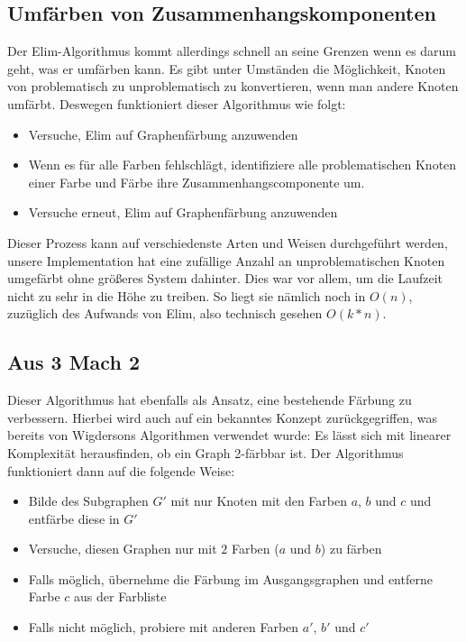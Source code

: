 \documentclass[11pt]{article}
\begin{document}
\subsection{Umfärben von Zusammenhangskomponenten}

Der Elim-Algorithmus kommt allerdings schnell an seine Grenzen wenn es darum geht, was er umfärben kann. Es gibt unter Umständen die Möglichkeit,
Knoten von problematisch zu unproblematisch zu konvertieren, wenn man andere Knoten umfärbt. Deswegen funktioniert dieser Algorithmus wie folgt: \\

\begin{itemize}
  \item Versuche, Elim auf Graphenfärbung anzuwenden
  \item Wenn es für alle Farben fehlschlägt, identifiziere alle problematischen Knoten einer Farbe und Färbe ihre Zusammenhangscomponente um.
  \item Versuche erneut, Elim auf Graphenfärbung anzuwenden
\end{itemize}

Dieser Prozess kann auf verschiedenste Arten und Weisen durchgeführt werden, unsere Implementation hat eine zufällige Anzahl an unproblematischen Knoten umgefärbt ohne größeres System dahinter.
Dies war vor allem, um die Laufzeit nicht zu sehr in die Höhe zu treiben. So liegt sie nämlich noch in $O(n)$, zuzüglich des Aufwands von Elim, also technisch gesehen $O(k*n)$.

\subsection{Aus 3 Mach 2}

Dieser Algorithmus hat ebenfalls als Ansatz, eine bestehende Färbung zu verbessern. Hierbei wird auch auf ein bekanntes Konzept
zurückgegriffen, was bereits von Wigdersons Algorithmen verwendet wurde: Es lässt sich mit linearer Komplexität herausfinden,
ob ein Graph 2-färbbar ist. Der Algorithmus funktioniert dann auf die folgende Weise: \\

\begin{itemize}
  \item Bilde des Subgraphen $G'$ mit nur Knoten mit den Farben $a$, $b$ und $c$ und entfärbe diese in $G'$
  \item Versuche, diesen Graphen nur mit $2$ Farben ($a$ und $b$) zu färben
  \item Falls möglich, übernehme die Färbung im Ausgangsgraphen und entferne Farbe $c$ aus der Farbliste
  \item Falls nicht möglich, probiere mit anderen Farben $a'$, $b'$ und $c'$
\end{itemize}
\end{document}
